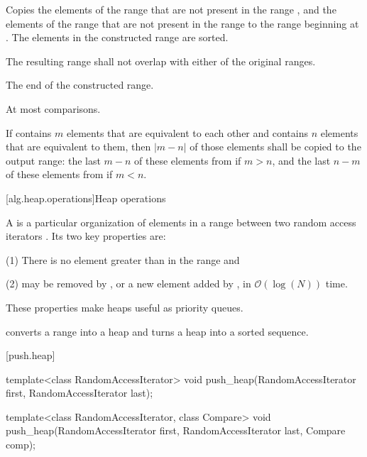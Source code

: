 \begin{itemdescr}
\pnum
\effects
Copies the elements of the range
that are not present in the range
,
and the elements of the range
that are not present in the range
to the range beginning at
.
The elements in the constructed range are sorted.

\pnum
\requires
The resulting range shall not overlap with either of the original ranges.

\pnum
\returns
The end of the constructed range.

\pnum
\complexity
At most
comparisons.

\pnum
\notes
If  contains $m$ elements that are equivalent to each other and
 contains $n$ elements that are equivalent to them, then
$|m - n|$ of those elements shall be copied to the output range: the last
$m - n$ of these elements from  if $m > n$, and the last 
$n - m$ of these elements from  if $m < n$.
\end{itemdescr}

[alg.heap.operations]{Heap operations}

\pnum
A
is a particular organization of elements in a range between two random access iterators
.
Its two key properties are:

\begin{description}
\item{(1)} There is no element greater than
in the range and
\item{(2)} 
may be removed by
,
or a new element added by
,
in
$\mathcal{O}(\log(N))$
time.
\end{description}

\pnum
These properties make heaps useful as priority queues.

\pnum
{}
converts a range into a heap and
turns a heap into a sorted sequence.

[push.heap]{}

%
\begin{itemdecl}
template<class RandomAccessIterator>
  void push_heap(RandomAccessIterator first, RandomAccessIterator last);

template<class RandomAccessIterator, class Compare>
  void push_heap(RandomAccessIterator first, RandomAccessIterator last,
                 Compare comp);
\end{itemdecl}

